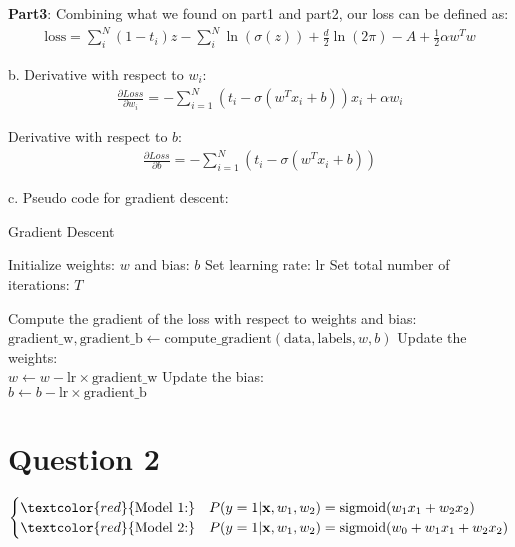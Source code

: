 \documentclass{article}
\begin{document}
\textbf{Part3}: Combining what we found on part1 and part2, our loss can be defined as:
\[
\begin{aligned}
\text{loss} = \sum_{i}^{N} (1 - t_i)z - \sum_{i}^{N} \ln(\sigma(z)) + \frac{d}{2}\ln(2\pi) - A + \frac{1}{2} \alpha w^Tw
\end{aligned}
\]

\bigskip
\hrulefill
\bigskip

b. Derivative with respect to $w_i$:
\[
\begin{aligned}
\frac{\partial Loss}{\partial w_i} = - \sum_{i=1}^{N} \left(t_i - \sigma (w^Tx_i + b)\right) x_i + \alpha w_i
\end{aligned}
\]

Derivative with respect to $b$:
\[
\begin{aligned}
\frac{\partial Loss}{\partial b} = - \sum_{i=1}^{N} \left(t_i - \sigma (w^Tx_i + b)\right)
\end{aligned}
\]


\bigskip
\hrulefill
\bigskip

c. Pseudo code for gradient descent:

\begin{algorithm}
\caption{Gradient Descent}
\begin{algorithmic}[1]
\State Initialize weights: $w$ and bias: $b$
\State Set learning rate: $\text{lr}$
\State Set total number of iterations: $T$

    \State Compute the gradient of the loss with respect to weights and bias:\\
    \quad \quad \quad $\text{gradient\_w}, \text{gradient\_b} \gets \text{compute\_gradient}(\text{data}, \text{labels}, w, b)$
    \State Update the weights:\\
    \quad \quad \quad $w \gets w - \text{lr} \times \text{gradient\_w}$
    \State Update the bias:\\
    \quad \quad \quad $b \gets b - \text{lr} \times \text{gradient\_b}$
\EndFor
\end{algorithmic}
\end{algorithm}

\pagebreak

\section{Question 2}

\[
\begin{cases}
\textcolor{red}{\text{Model 1:}} & P(y = 1 | \mathbf{x}, w_1, w_2) = \text{sigmoid}(w_1x_1 + w_2x_2) \\
\textcolor{red}{\text{Model 2:}} & P(y = 1 | \mathbf{x}, w_1, w_2) = \text{sigmoid}(w_0 + w_1x_1 + w_2x_2)
\end{cases}
\]
\end{document}
